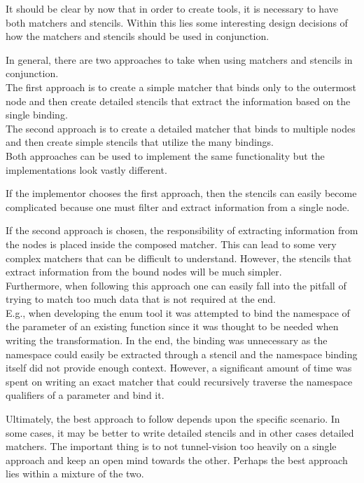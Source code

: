 It should be clear by now that in order to create tools, it is necessary to have both matchers and stencils. Within this lies some interesting design decisions of how the matchers and stencils should be used in conjunction.

In general, there are two approaches to take when using matchers and stencils in conjunction.\\
The first approach is to create a simple matcher that binds only to the outermost node and then create detailed stencils that extract the information based on the single binding.\\
The second approach is to create a detailed matcher that binds to multiple nodes and then create simple stencils that utilize the many bindings.\\
Both approaches can be used to implement the same functionality but the implementations look vastly different.
 
If the implementor chooses the first approach, then the stencils can easily become complicated because one must filter and extract information from a single node.

If the second approach is chosen, the responsibility of extracting information from the nodes is placed inside the composed matcher. This can lead to some very complex matchers that can be difficult to understand. However, the stencils that extract information from the bound nodes will be much simpler.\\
Furthermore, when following this approach one can easily fall into the pitfall of trying to match too much data that is not required at the end.\\
E.g., when developing the enum tool it was attempted to bind the namespace of the parameter of an existing  function since it was thought to be needed when writing the transformation. In the end, the binding was unnecessary as the namespace could easily be extracted through a stencil and the namespace binding itself did not provide enough context.
However, a significant amount of time was spent on writing an exact matcher that could recursively traverse the namespace qualifiers of a parameter and bind it.

Ultimately, the best approach to follow depends upon the specific scenario. In some cases, it may be better to write detailed stencils and in other cases detailed matchers. The important thing is to not tunnel-vision too heavily on a single approach and keep an open mind towards the other. Perhaps the best approach lies within a mixture of the two.

